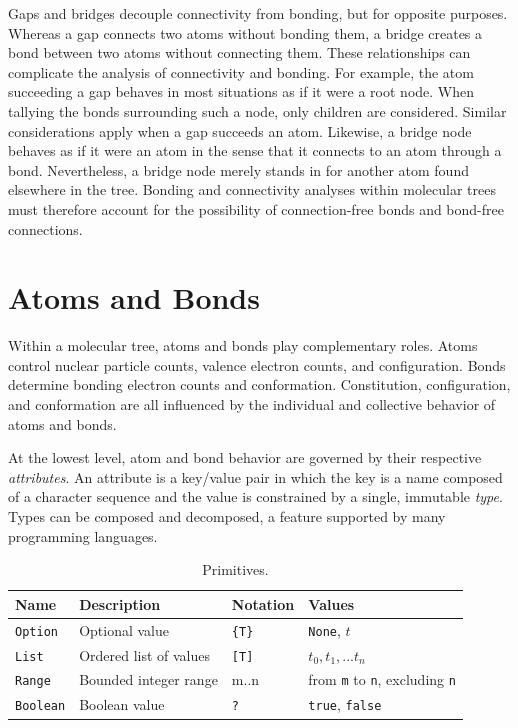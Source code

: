 \documentclass{article}
\def\ttt{\texttt}
\begin{document}
Gaps and bridges decouple connectivity from bonding, but for opposite purposes. Whereas a gap connects two atoms without bonding them, a bridge creates a bond between two atoms without connecting them. These relationships can complicate the analysis of connectivity and bonding. For example, the atom succeeding a gap behaves in most situations as if it were a root node. When tallying the bonds surrounding such a node, only children are considered. Similar considerations apply when a gap succeeds an atom. Likewise, a bridge node behaves as if it were an atom in the sense that it connects to an atom through a bond. Nevertheless, a bridge node merely stands in for another atom found elsewhere in the tree. Bonding and connectivity analyses within molecular trees must therefore account for the possibility of connection-free bonds and bond-free connections. 

\section*{Atoms and Bonds}
\label{atoms-and-bonds}

Within a molecular tree, atoms and bonds play complementary roles. Atoms control nuclear particle counts, valence electron counts, and configuration. Bonds determine bonding electron counts and conformation. Constitution, configuration, and conformation are all influenced by the individual and collective behavior of atoms and bonds.

At the lowest level, atom and bond behavior are governed by their respective \textit{attributes}. An attribute is a key/value pair in which the key is a name composed of a character sequence and the value is constrained by a single, immutable \textit{type}. Types can be composed and decomposed, a feature supported by many programming languages.

\begin{table}
\begin{minipage}{\textwidth}
\renewcommand*\footnoterule{}
\caption{Primitives.}
\label{table:primitives}
\centering
\begin{tabular}{l l l l}
    \hline
    Name & Description & Notation & Values \\
    \hline
    \ttt{Option} & Optional value & \ttt{\{T\}} & \ttt{None}, $t$ \\
    \ttt{List} & Ordered list of values & \ttt{[T]} & $t_0, t_1, ... t_n$ \\
    \ttt{Range} & Bounded integer range & m..n & from \ttt{m} to \ttt{n}, excluding \ttt{n} \\
    \ttt{Boolean} & Boolean value & \ttt{?} & \ttt{true}, \ttt{false} \\
    \hline
\end{tabular}
\end{minipage}
\end{table}
\end{document}
